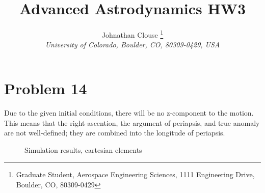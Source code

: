 \documentclass[]{aiaa-tc}%
\title{Advanced Astrodynamics HW3}
\author{
	Johnathan Clouse%
	\thanks{Graduate Student, Aerospace Engineering Sciences, 1111 Engineering Drive, Boulder, CO, 80309-0429}\\
	{\normalsize\itshape
		University of Colorado, Boulder, CO, 80309-0429, USA}
}
\begin{document}
	

	
	\maketitle
	
	\begin{abstract}
		\noindent 
		
	\end{abstract}
	
	\newpage
	
	\tableofcontents
	
	\newpage
	\section{Problem 14}
Due to the given initial conditions, there will be no z-component to the motion. This means that the right-ascention, the argument of periapsis, and true anomaly are not well-defined; they are combined into the longitude of periapsis. 


	\begin{figure}[H]
		\centering
	\caption{Simulation results, cartesian elements }
		\label{fig:P14_cart}
	\end{figure}	
\end{document}
